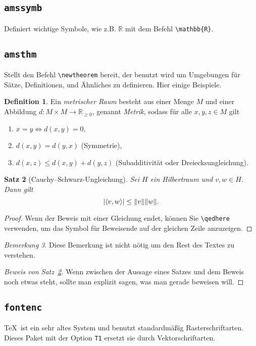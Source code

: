 \documentclass[11pt, a4paper, german]{article}
\theoremstyle{plain}
\newtheorem{theorem}{Satz}
\theoremstyle{remark}
\newtheorem{remark}[theorem]{Bemerkung}
\theoremstyle{definition}
\newtheorem{definition}[theorem]{Definition}
\numberwithin{equation}{section}
\numberwithin{theorem}{section}
\DeclarePairedDelimiter\abs{\lvert}{\rvert}
\DeclarePairedDelimiter\norm{\lVert}{\rVert}
\begin{document}
\subsection{\texttt{amssymb}}
Definiert wichtige Symbole, wie z.B. $\mathbb{R}$ mit dem Befehl \verb|\mathbb{R}|.

\subsection{\texttt{amsthm}}
Stellt den Befehl \verb|\newtheorem| bereit, der benutzt wird um Umgebungen für Sätze, Definitionen, und Ähnliches zu definieren.
Hier einige Beispiele.

\begin{definition}
Ein \emph{metrischer Raum} besteht aus einer Menge $M$ und einer Abbildung $d : M \times M \to \mathbb{R}_{\geq 0}$, genannt \emph{Metrik}, sodass für alle $x,y,z\in M$ gilt
\begin{enumerate}
\item $x=y \iff d(x,y)=0$,
\item $d(x,y)=d(y,x)$ (Symmetrie),
\item $d(x,z) \leq d(x,y)+d(y,z)$ (Subadditivität oder Dreiecksungleichung).
\end{enumerate}
\end{definition}

\begin{theorem}[Cauchy--Schwarz-Ungleichung]
\label{thm:Cauchy-Schwarz}
Sei $H$ ein Hilbertraum und $v,w \in H$.
Dann gilt
\[
\abs{ \langle v,w \rangle }
\leq
\norm{v} \norm{w}.
\]
\end{theorem}
\begin{proof}
Wenn der Beweis mit einer Gleichung endet, können Sie \verb|\qedhere| verwenden, um das Symbol für Beweisende auf der gleichen Zeile anzuzeigen.
\end{proof}
\begin{remark}
Diese Bemerkung ist nicht nötig um den Rest des Textes zu verstehen.
\end{remark}

\begin{proof}[Beweis von Satz~\ref{thm:Cauchy-Schwarz}]
Wenn zwischen der Aussage eines Satzes und dem Beweis noch etwas steht, sollte man explizit sagen, was man gerade beweisen will.
\end{proof}

\subsection{\texttt{fontenc}}
\TeX\ ist ein sehr altes System und benutzt standardmäßig Rasterschriftarten.
Dieses Paket mit der Option \verb|T1| ersetzt sie durch Vektorschriftarten.
\end{document}

